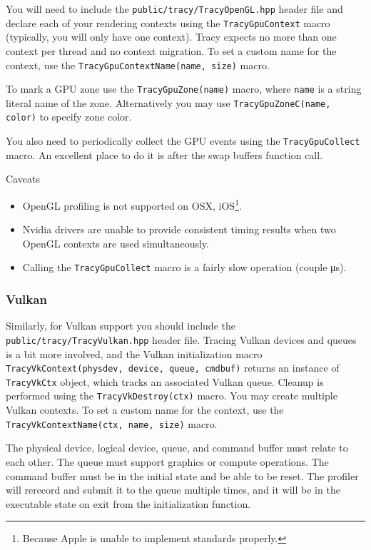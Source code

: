 \documentclass[hidelinks,titlepage,a4paper,twoside]{article}
\begin{document}
You will need to include the \texttt{public/tracy/TracyOpenGL.hpp} header file and declare each of your rendering contexts using the \texttt{TracyGpuContext} macro (typically, you will only have one context). Tracy expects no more than one context per thread and no context migration. To set a custom name for the context, use the \texttt{TracyGpuContextName(name, size)} macro.

To mark a GPU zone use the \texttt{TracyGpuZone(name)} macro, where \texttt{name} is a string literal name of the zone. Alternatively you may use \texttt{TracyGpuZoneC(name, color)} to specify zone color.

You also need to periodically collect the GPU events using the \texttt{TracyGpuCollect} macro. An excellent place to do it is after the swap buffers function call.

\begin{bclogo}[
noborder=true,
couleur=black!5,
logo=\bcattention
]{Caveats}
\begin{itemize}
\item OpenGL profiling is not supported on OSX, iOS\footnote{Because Apple is unable to implement standards properly.}.
\item Nvidia drivers are unable to provide consistent timing results when two OpenGL contexts are used simultaneously.
\item Calling the \texttt{TracyGpuCollect} macro is a fairly slow operation (couple \si{\micro\second}).
\end{itemize}
\end{bclogo}

\subsubsection{Vulkan}

Similarly, for Vulkan support you should include the \texttt{public/tracy/TracyVulkan.hpp} header file. Tracing Vulkan devices and queues is a bit more involved, and the Vulkan initialization macro \texttt{TracyVkContext(physdev, device, queue, cmdbuf)} returns an instance of \texttt{TracyVkCtx} object, which tracks an associated Vulkan queue. Cleanup is performed using the \texttt{TracyVkDestroy(ctx)} macro. You may create multiple Vulkan contexts. To set a custom name for the context, use the \texttt{TracyVkContextName(ctx, name, size)} macro.

The physical device, logical device, queue, and command buffer must relate to each other. The queue must support graphics or compute operations. The command buffer must be in the initial state and be able to be reset. The profiler will rerecord and submit it to the queue multiple times, and it will be in the executable state on exit from the initialization function.
\end{document}
